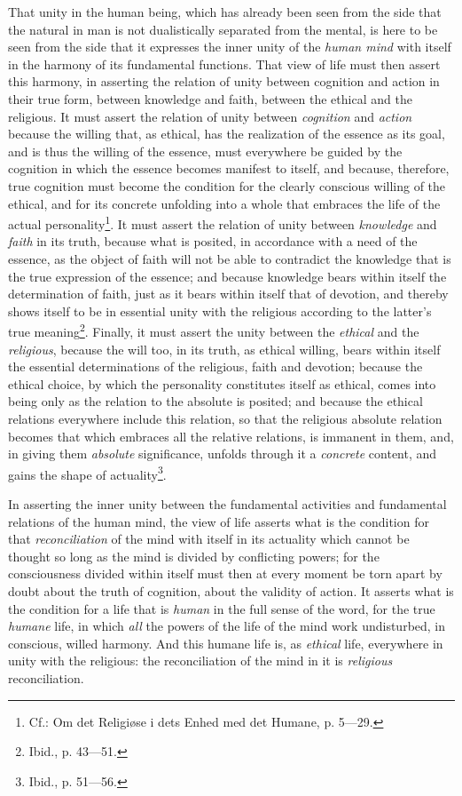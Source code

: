 That unity in the human being, which has already been seen from the
side that the natural in man is not dualistically separated from the
mental, is here to be seen from the side that it expresses the inner
unity of the \emph{human mind} with itself in the harmony of its
fundamental functions. That view of life must then assert this harmony,
in asserting the relation of unity between cognition and action in
their true form, between knowledge and faith, between the ethical and
the religious. It must assert the relation of unity between
\emph{cognition} and \emph{action} because the willing that, as
ethical, has the realization of the essence as its goal, and is thus
the willing of the essence, must everywhere be guided by the cognition
in which the essence becomes manifest to itself, and because, therefore,
true cognition must become the condition for the clearly conscious
willing of the ethical, and for its concrete unfolding into a whole
that embraces the life of the actual personality\footnote{
Cf.: Om det Religiøse i dets Enhed med det Humane, p. 5---29.}.
It must assert the relation of unity between \emph{knowledge} and
\emph{faith} in its truth, because what is posited, in accordance with
a need of the essence, as the object of faith will not be able to
contradict the knowledge that is the true expression of the essence;
and because knowledge bears within itself the determination of faith,
just as it bears within itself that of devotion, and thereby shows
itself to be in essential unity with the religious according to the
latter's true meaning\footnote{
Ibid., p. 43---51.}. Finally, it must assert the unity between the
\emph{ethical} and the \emph{religious}, because the will too,
 \setcounter{footnote}{0}in its truth, as ethical willing,
bears within itself the essential determinations of the religious,
faith and devotion; because the ethical choice, by which the
personality constitutes itself as ethical, comes into being only as the
relation to the absolute is posited; and because the ethical relations
everywhere include this relation, so that the religious absolute
relation becomes that which embraces all the relative relations, is
immanent in them, and, in giving them \emph{absolute} significance,
unfolds through it a \emph{concrete} content, and gains the shape of
actuality\footnote{
Ibid., p. 51---56.}.

In asserting the inner unity between the fundamental activities and
fundamental relations of the human mind, the view of life asserts what
is the condition for that \emph{reconciliation} of the mind with itself
in its actuality which cannot be thought so long as the mind is divided
by conflicting powers; for the consciousness divided within itself must
then at every moment be torn apart by doubt about the truth of
cognition, about the validity of action. It asserts what is the
condition for a life that is \emph{human} in the full sense of the
word, for the true \emph{humane} life, in which \emph{all} the powers
of the life of the mind work undisturbed, in conscious, willed harmony.
And this humane life is, as \emph{ethical} life, everywhere in unity
with the religious: the reconciliation of the mind in it is
\emph{religious} reconciliation.

